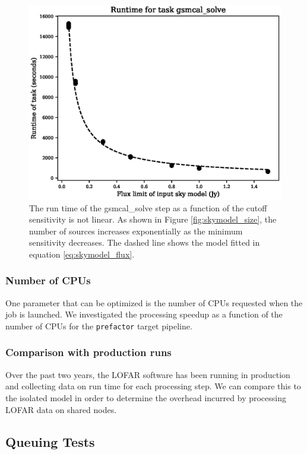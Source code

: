 \documentclass[preprint,5p]{elsarticle}
\begin{document}
\begin{figure}
    \includegraphics[width=0.95\linewidth]{figures/skymodel_flux.eps}
      \caption{The run time of the gsmcal\_solve step as a function of the cutoff sensitivity is not linear. As shown in Figure \ref{fig:skymodel_size}, the number of sources increases exponentially as the minimum sensitivity decreases. The dashed line shows the model fitted in equation \ref{eq:skymodel_flux}. }
	\label{fig:skymodel_run_sens}
\end{figure}

\subsubsection{Number of CPUs}
One parameter that can be optimized is the number of CPUs requested when the job is launched. We investigated the processing speedup as a function of the number of CPUs for the \texttt{prefactor} target pipeline. 


\subsubsection{Comparison with production runs}
Over the past two years, the LOFAR software has been running in production and collecting data on run time for each processing step. We can compare this to the isolated model in order to determine the overhead incurred by processing LOFAR data on shared nodes. 

\subsection{Queuing Tests}
\end{document}

